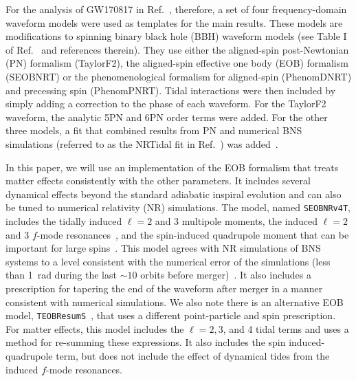 \documentclass[prd,aps,letter,twocolumn,floatfix,notitlepage,nofootinbib]{revtex4-1}
\begin{document}
For the analysis of GW170817 in Ref.~\cite{BNSPE}, therefore, a set of four frequency-domain waveform models were used as templates for the main results. These models are modifications to spinning binary black hole (BBH) waveform models (see Table I of Ref.~\cite{BNSPE} and references therein). They use either the aligned-spin post-Newtonian (PN) formalism (TaylorF2), the aligned-spin effective one body (EOB) formalism (SEOBNRT) or the phenomenological formalism for aligned-spin (PhenomDNRT) and precessing spin (PhenomPNRT). Tidal interactions were then included by simply adding a correction to the phase of each waveform. For the TaylorF2 waveform, the analytic 5PN and 6PN order terms were added. For the other three models, a fit that combined results from PN and numerical BNS simulations (referred to as the NRTidal fit in Ref.~\cite{BNSPE}) was added~\cite{DietrichBernuzziTichy2017}.

In this paper, we will use an implementation of the EOB formalism that treats matter effects consistently with the other parameters. It includes several dynamical effects beyond the standard adiabatic inspiral evolution and can also be tuned to numerical relativity (NR) simulations. The model, named \texttt{SEOBNRv4T}, includes the tidally induced $\ell=2$ and 3 multipole moments, the induced $\ell=2$ and 3 $f$-mode resonances~\cite{Hinderer:2016eia,Steinhoff:2016rfi}, and the spin-induced quadrupole moment that can be important for large spins~\cite{Poisson1998, HarryHinderer2018}. This model agrees with NR simulations of BNS systems to a level consistent with the numerical error of the simulations (less than 1~rad during the last $\sim 10$ orbits before merger)~\cite{DietrichHinderer2017, KiuchiKawaguchiKyutoku2017}. It also includes a prescription for tapering the end of the waveform after merger in a manner consistent with numerical simulations. We also note there is an alternative EOB model, \texttt{TEOBResumS}~\cite{NagarBernuzziDelpozzo2018}, that uses a different point-particle and spin prescription. For matter effects, this model includes the $\ell = 2, 3$, and 4 tidal terms and uses a method for re-summing these expressions. It also includes the spin induced-quadrupole term, but does not include the effect of dynamical tides from the induced $f$-mode resonances. 
\end{document}
